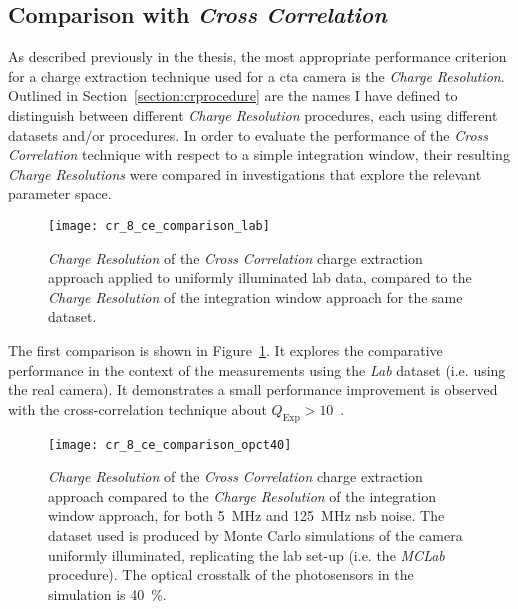 \subsection{Comparison with \textit{Cross Correlation}}

As described previously in the thesis, the most appropriate performance criterion for a charge extraction technique used for a \gls{cta} camera is the \textit{Charge Resolution}. Outlined in Section~\ref{section:crprocedure} are the names I have defined to distinguish between different \textit{Charge Resolution} procedures, each using different datasets and/or procedures. In order to evaluate the performance of the \textit{Cross Correlation} technique with respect to a simple integration window, their resulting \textit{Charge Resolutions} were compared in investigations that explore the relevant parameter space.

\begin{figure}
  \texttt{[image: cr\_8\_ce\_comparison\_lab]}
  \caption[\textit{Charge Resolution} comparison between \textit{Cross Correlation} and \textit{Window Integration} for \textit{Lab} data.]{\textit{Charge Resolution} of the \textit{Cross Correlation} charge extraction approach applied to uniformly illuminated lab data, compared to the \textit{Charge Resolution} of the integration window approach for the same dataset.}
  \label{fig:cr_8_ce_comparison_lab}
\end{figure}

The first comparison is shown in Figure~\ref{fig:cr_8_ce_comparison_lab}. It explores the comparative performance in the context of the measurements using the \textit{Lab} dataset (i.e. using the real camera). It demonstrates a small performance improvement is observed with the cross-correlation technique about $Q_\text{Exp} > 10$~\si{\pe}.

\begin{figure}
  \texttt{[image: cr\_8\_ce\_comparison\_opct40]}
  \caption[\textit{Charge Resolution} comparison between \textit{Cross Correlation} and \textit{Window Integration} for \textit{MCLab} data with an optical crosstalk of \SI{40}{\percent}.]{\textit{Charge Resolution} of the \textit{Cross Correlation} charge extraction approach compared to the \textit{Charge Resolution} of the integration window approach, for both \SI{5}{MHz} and \SI{125}{MHz} \gls{nsb} noise. The dataset used is produced by Monte Carlo simulations of the camera uniformly illuminated, replicating the lab set-up (i.e. the \textit{MCLab} procedure). The optical crosstalk of the photosensors in the simulation is \SI{40}{\percent}.}
  \label{fig:cr_8_ce_comparison_opct40}
\end{figure}

